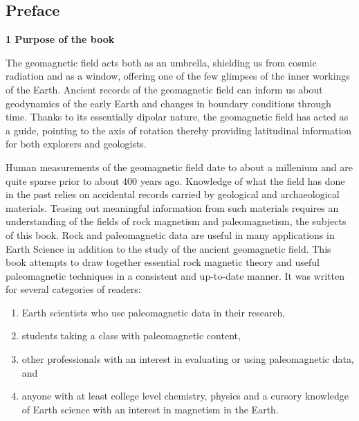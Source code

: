 \subsection*{Preface}

{\bf 1  Purpose of the book}

The geomagnetic field acts both as an umbrella, shielding us from cosmic radiation and as a window, offering one of the few glimpses of the inner workings of the Earth.  Ancient records of the geomagnetic field can inform us about geodynamics of the early Earth and changes in boundary conditions through time.    Thanks to its essentially dipolar nature, the geomagnetic field  has acted as a guide, pointing to the axis of rotation thereby providing latitudinal information for both explorers and geologists. 

  Human measurements of the geomagnetic field date to about  a millenium and are quite sparse prior to about 400 years ago. Knowledge of what the field has done in the past relies on accidental records carried by geological and archaeological materials.  Teasing out meaningful information from such materials requires  an understanding of  the fields of rock magnetism and paleomagnetism, the subjects of this book. 
Rock and paleomagnetic data are useful in many applications in Earth Science in addition to the study of the ancient geomagnetic field.
   This book attempts to
draw together essential rock magnetic theory and useful paleomagnetic techniques   in a
consistent and up-to-date manner.  It was written for several categories of
readers:

\begin{enumerate}
\item Earth scientists who use paleomagnetic data in their research,

\item  students taking a class with paleomagnetic content,

\item  other professionals with an interest in evaluating or using paleomagnetic data, and

\item anyone with at least college level chemistry, physics and a cursory knowledge of Earth science with an interest in magnetism in the Earth. 
\end{enumerate}

